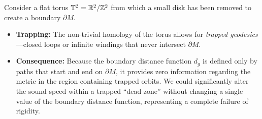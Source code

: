 \begin{example}
  Consider a flat torus $\mathbb{T}^2 = \mathbb{R}^2 / \mathbb{Z}^2$ from which a small disk has been removed to create a boundary $\partial M$. 

  \begin{itemize}
    \item \textbf{Trapping:} The non-trivial homology of the torus allows for \emph{trapped geodesics}---closed loops or infinite windings that never intersect $\partial M$. 
    \item \textbf{Consequence:} Because the boundary distance function $d_g$ is defined only by paths that start and end on $\partial M$, it provides zero information regarding the metric in the region containing trapped orbits. We could significantly alter the sound speed within a trapped ``dead zone'' without changing a single value of the boundary distance function, representing a complete failure of rigidity.
  \end{itemize}
\end{example}


